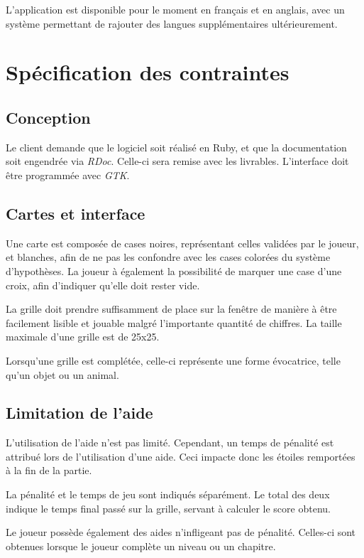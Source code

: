 \documentclass[a4paper, 12pt]{report}
\begin{document}
			L'application est disponible pour le moment en français et en anglais, avec un système permettant de rajouter des langues supplémentaires ultérieurement.


\chapter{Spécification des contraintes}
\vspace*{0.5cm}
	\section{Conception}
	
		Le client demande que le logiciel soit réalisé en Ruby, et que la documentation soit engendrée via \textit{RDoc}. Celle-ci sera remise avec les livrables. L'interface doit être programmée avec \textit{GTK}.
		
	\section{Cartes et interface}
	
		Une carte est composée de cases noires, représentant celles validées par le joueur, et blanches, afin de ne pas les confondre avec les cases colorées du système d'hypothèses.
		La joueur à également la possibilité de marquer une case d'une croix, afin d'indiquer qu'elle doit rester vide.
		
		La grille doit prendre suffisamment de place sur la fenêtre de manière à être facilement lisible et jouable malgré l'importante quantité de chiffres. La taille maximale d'une grille est de 25x25.
		
		Lorsqu'une grille est complétée, celle-ci représente une forme évocatrice, telle qu'un objet ou un animal.
	
	\section{Limitation de l'aide}
	
		L'utilisation de l'aide n'est pas limité. Cependant, un temps de pénalité est attribué lors de l'utilisation d'une aide. Ceci impacte donc les étoiles remportées à la fin de la partie. 
		
		La pénalité et le temps de jeu sont indiqués séparément. Le total des deux indique le temps final passé sur la grille, servant à calculer le score obtenu. 
		
		Le joueur possède également des aides n'infligeant pas de pénalité. Celles-ci sont obtenues lorsque le joueur complète un niveau ou un chapitre. 
	
\end{document}
